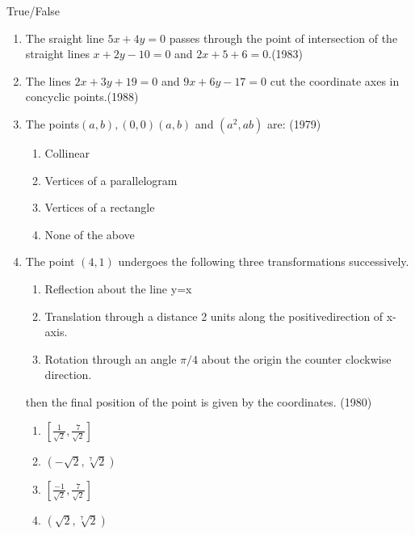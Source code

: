 \documentclass[12pt]{article}
\providecommand{\brak}[1]{\ensuremath{\left(#1\right)}}
\providecommand{\sbrak}[1]{\ensuremath{{}\left[#1\right]}}
\begin{document}
\begin{enumerate}
		\fi
		True/False
		\begin{enumerate}[resume*]

\item  The sraight line $5x+4y=0$ passes through the point of intersection of the straight lines $x+2y-10=0$ and $2x+5+6=0$.(1983)
\item The lines $2x+3y+19=0$ and  $9x+6y-17=0$ cut the coordinate axes in concyclic points.(1988)

\item The points$(a,b),(0,0)(a,b)$ and $(a^2,ab)$ are: (1979)
\begin{enumerate}
\item Collinear
\item Vertices of a parallelogram
\item Vertices of a rectangle
\item None of the above
\end{enumerate}
\item The point $(4,1)$ undergoes the following three transformations successively.
\begin{enumerate}
\item Reflection about the line y=x\\
\item Translation through a distance 2 units along the positivedirection of x-axis.\\
\item Rotation through an angle $\pi/4$ about the origin the counter clockwise direction.\\
\end{enumerate}

then the final position of the point is given by the coordinates. (1980)
\begin{enumerate}
\item  $\sbrak{\frac{1}{\sqrt{2}},\frac{7}{\sqrt{2}}}$
\item  $\brak{-\sqrt{2}, \sqrt[7]{2}}$  
\item  $\sbrak{\frac{-1}{\sqrt{2}},\frac{7}{\sqrt{2}}}$
\item  $\brak{\sqrt{2}, \sqrt[7]{2}}$
\end{enumerate}


\end{enumerate}
\end{enumerate}
\end{document}
